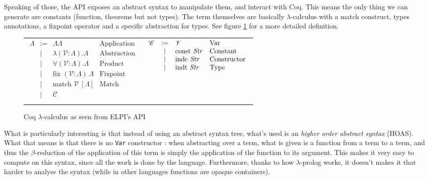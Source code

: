 \documentclass{article}
\newcommand{\C}{\mathscr{C}}
\newcommand{\V}{\mathscr{V}}
\begin{document}
Speaking of those, the API exposes an abstract syntax to manipulate them, and
interact with Coq. This means the only thing we can generate are constants
(function, theorems but not types). The term themselves are basically
$\lambda$-calculus with a match construct, types annotations, a fixpoint operator
and a specific abstraction for types. See figure \ref{LambdaCoq} for a more
detailed definition.

\begin{figure}
    \begin{center}\begin{tabular}{cc}
        $\begin{array}{rcll}
            \Lambda & := & \Lambda\Lambda & \text{Application} \\
                    & |  & \lambda (\V : \Lambda). \Lambda & \text{Abstraction} \\
                    & |  & \forall (\V : \Lambda). \Lambda & \text{Product} \\
                    & |  & \text{fix } (\V : \Lambda)\ \Lambda & \text{Fixpoint} \\
                    & |  & \text{match } \V\ [\Lambda] & \text{Match} \\
                    & |  & \C & \\
        \end{array}$ & $\begin{array}{rcll}
            \C & := & \V & \text{Var} \\
               & |  & \text{const \emph{Str}} & \text{Constant} \\
               & |  & \text{indc \emph{Str}}  & \text{Constructor} \\
               & |  & \text{indt \emph{Str}}  & \text{Type} \\
        \end{array}$ \\
    \end{tabular}\end{center}
    \caption{Coq $\lambda$-calculus as seen from ELPI's API}
    \label{LambdaCoq}
\end{figure}

What is particularly interesting is that instead of using an abstract syntax tree,
what's used is an \emph{higher order abstract syntax} (HOAS). What that means is
that there is no \texttt{Var} constructor : when abstracting over a term, what
is given is a function from a term to a term, and thus the $\beta$-reduction
of the application of this term is simply the application of the function to
its argument. This makes it very easy to compute on this syntax, since all the
work is done by the language. Furthermore, thanks to how $\lambda$-prolog works,
it doesn't makes it that harder to analyse the syntax (while in other languages
functions are opaque containers).
\end{document}
